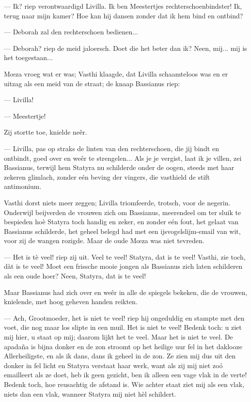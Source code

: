 \documentclass[a4paper, 12pt, oneside, dutch]{article}
\begin{document}
--- Ik? riep verontwaardigd Livilla. Ik ben Meestertjes rechterschoenbindster! Ik, terug naar mijn kamer? Hoe kan hij dansen zonder dat ik hem bind en ontbind?

--- Deborah zal den rechterschoen bedienen...

--- Deborah? riep de meid jaloersch. Doet die het beter dan ik? Neen, mij... mij is het toegestaan...

Mœza vroeg wat er was; Vasthi klaagde, dat Livilla schaamteloos was en er uitzag als een meid van de straat; de knaap Bassianus riep:

--- Livilla!

--- Meestertje!

Zij stortte toe, knielde neêr.

--- Livilla, pas op straks de linten van den rechterschoen, die jij bindt en ontbindt, goed over en weêr te strengelen... Als je je vergist, laat ik je villen, zei Bassianus, terwijl hem Statyra nu schilderde onder de oogen, steeds met haar zekeren glimlach, zonder eén beving der vingers, die vasthield de stift antimonium.

Vasthi dorst niets meer zeggen; Livilla triomfeerde, trotsch, voor de negerin. Onderwijl beijverden de vrouwen zich om Bassianus, meerendeel om ter sluik te bespieden hoè Statyra toch handig en zeker, en zonder eén fout, het gelaat van Bassianus schilderde, het geheel belegd had met een ijsvogelslijm-email van wit, voor zij de wangen rozigde. Maar de oude Mœza was niet tevreden.

--- Het is tè veel! riep zij uit. Veel te veel! Statyra, dat is te veel! Vasthi, zie toch, dàt is te veel! Moet een frissche mooie jongen als Bassianus zich laten schilderen als een oude hoer? Neen, Statyra, dat is te veel!

Maar Bassianus had zich over en weêr in alle de spiegels bekeken, die de vrouwen, knielende, met hoog geheven handen reikten.

--- Ach, Grootmoeder, het ìs niet te veel! riep hij ongeduldig en stampte met den voet, die nog maar los slipte in een muil. Het is niet te veel! Bedenk toch: u ziet mij hier, u staat op mij; daarom lijkt het te veel. Maar het is niet te veel. De apadaña is bijna donker en de zon stroomt op het heilige uur fel in het daklooze Allerheiligste, en als ik dans, dans ik geheel in de zon. Ze zien mij dus uit den donker in fel licht en Statyra verstaat haar werk, want als zij mij niet zoó emailleert als ze doet, heb ik geen gezicht, ben ik alleen een vage vlak in de verte! Bedenk toch, hoe reusachtig de afstand is. Wie achter staat ziet mij als een vlak, niets dan een vlak, wanneer Statyra mij niet hèl schildert.
\end{document}
